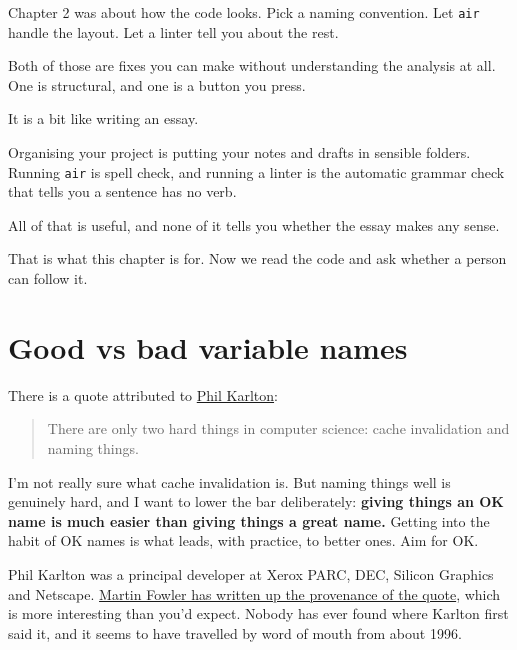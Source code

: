 \documentclass[
  letterpaper,
  justified,
  a4paper]{tufte-book}
\newcounter{none} %
\begin{document}
Chapter 2 was about how the code looks. Pick a naming convention. Let
\texttt{air} handle the layout. Let a linter tell you about the rest.

Both of those are fixes you can make without understanding the analysis
at all. One is structural, and one is a button you press.

It is a bit like writing an essay.

Organising your project is putting your notes and drafts in sensible
folders. Running \texttt{air} is spell check, and running a linter is
the automatic grammar check that tells you a sentence has no verb.

All of that is useful, and none of it tells you whether the essay makes
any sense.

That is what this chapter is for. Now we read the code and ask whether a
person can follow it.

\section{Good vs bad variable names}\label{good-vs-bad-variable-names}

There is a quote attributed to \href{https://www.karlton.org/}{Phil
Karlton}:

\begin{quote}
There are only two hard things in computer science: cache invalidation
and naming things.
\end{quote}

I'm not really sure what cache invalidation is. But naming things well
is genuinely hard, and I want to lower the bar deliberately:
\textbf{giving things an OK name is much easier than giving things a
great name.} Getting into the habit of OK names is what leads, with
practice, to better ones. Aim for OK.

\begin{tcolorbox}[enhanced jigsaw, arc=.35mm, bottomrule=.15mm, bottomtitle=1mm, breakable, colback=white, colbacktitle=quarto-callout-caution-color!10!white, colframe=quarto-callout-caution-color-frame, coltitle=black, left=2mm, leftrule=.75mm, opacityback=0, opacitybacktitle=0.6, rightrule=.15mm, title=\textcolor{quarto-callout-caution-color}{\faFire}\hspace{0.5em}{Some history: where the quote comes from}, titlerule=0mm, toprule=.15mm, toptitle=1mm]

Phil Karlton was a principal developer at Xerox PARC, DEC, Silicon
Graphics and Netscape.
\href{https://martinfowler.com/bliki/TwoHardThings.html}{Martin Fowler
has written up the provenance of the quote}, which is more interesting
than you'd expect. Nobody has ever found where Karlton first said it,
and it seems to have travelled by word of mouth from about 1996.

\end{tcolorbox}
\end{document}

